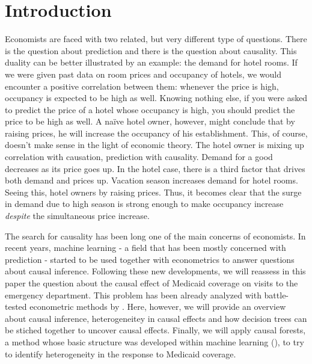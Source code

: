 



\newpage
\pagestyle{plain}
\setcounter{page}{1}    %


\section{Introduction}

Economists are faced with two related, but very different type of questions. There is the question about prediction and there is the question about causality. This duality can be better illustrated by an example: the demand for hotel rooms. If we were given past data on room prices and occupancy of hotels, we would encounter a positive correlation between them: whenever the price is high, occupancy is expected to be high as well. Knowing nothing else, if you were asked to predict the price of a hotel whose occupancy is high, you should predict the price to be high as well. A naïve hotel owner, however, might conclude that by raising prices, he will increase the occupancy of his establishment. This, of course, doesn't make sense in the light of economic theory. The hotel owner is mixing up correlation with causation, prediction with causality. Demand for a good decreases as its price goes up. In the hotel case, there is a third factor that drives both demand and prices up. Vacation season increases demand for hotel rooms. Seeing this, hotel owners by raising prices. Thus, it becomes clear that the surge in demand due to high season is strong enough to make occupancy increase \textit{despite} the simultaneous price increase.

The search for causality has been long one of the main concerns of economists. In recent years, machine learning - a field that has been mostly concerned with prediction - started to be used together with econometrics to answer questions about causal inference. Following these new developments, we will reassess in this paper the question about the causal effect of Medicaid coverage on visits to the emergency department. This problem has been already analyzed with battle-tested econometric methods by \cite{taubmanMedicaidIncreasesEmergencyDepartment2014} . Here, however, we will provide an overview about causal inference, heterogeneitey in causal effects and how decision trees can be stiched together to uncover causal effects. Finally, we will apply causal forests, a method whose basic structure was developed within machine learning (\cite{breimanRandomForests2001}), to try to identify heterogeneity in the response to Medicaid coverage.



